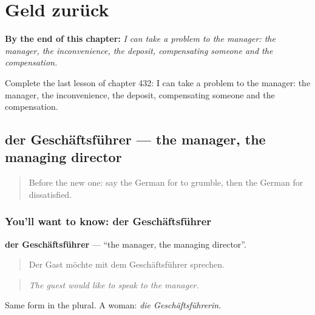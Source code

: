 
\chapter{Geld zurück}
\label{ch:ge-geld-zuruck}

\begin{chapteropening}
\textbf{By the end of this chapter:} \emph{I can take a problem to the manager: the manager, the inconvenience, the deposit, compensating someone and the compensation.}

Complete the last lesson of chapter 432: I can take a problem to the manager: the manager, the inconvenience, the deposit, compensating someone and the compensation.
\end{chapteropening}

\section[der Geschäftsführer]{der Geschäftsführer — the manager, the managing director}

\label{lesson:GE-C432-geschaeftsfuehrer}



\begin{quote}
Before the new one: say the German for to grumble, then the German for dissatisfied.
\end{quote}

\subsection*{You'll want to know: der Geschäftsführer}
\textbf{der Geschäftsführer} — \textquotedblleft{}the manager, the managing director\textquotedblright{}.

\begin{quote}
Der Gast möchte mit dem Geschäftsführer sprechen.
\end{quote}

\begin{quote}
\emph{The guest would like to speak to the manager.}
\end{quote}

Same form in the plural. A woman: \emph{die Geschäftsführerin}.

